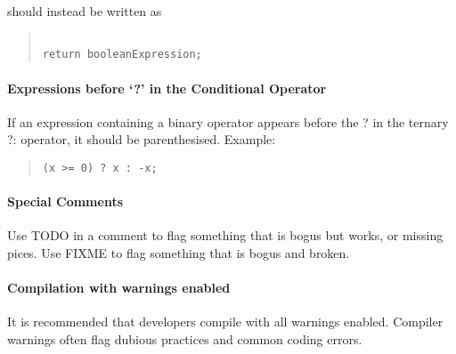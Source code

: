 \documentclass{article}
\begin{document}
should instead be written as 

\begin{quote}
\begin{verbatim}

return booleanExpression;

\end{verbatim}
\end{quote}

\paragraph{Expressions before `?' in the Conditional Operator }

If an expression containing a binary operator appears before the ? in
the ternary ?: operator, it should be parenthesised. Example:

\begin{quote}
\begin{verbatim}
(x >= 0) ? x : -x;

\end{verbatim}
\end{quote}

\paragraph{Special Comments}

Use TODO in a comment to flag something that is bogus but works, or
missing pices. Use FIXME to flag something that is bogus and broken.

\paragraph{Compilation with warnings enabled}

It is recommended that developers compile with all warnings enabled.
Compiler warnings often flag dubious practices and common coding
errors.
\end{document}
